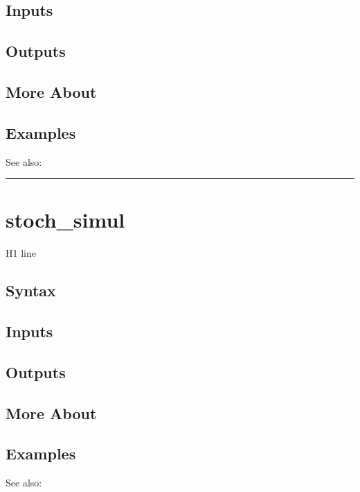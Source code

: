 \documentclass[letterpaper,10pt,english]{sphinxmanual}
\begin{document}
\subsection{Inputs}
\label{classes/models/@rfvar/rfvar:id156}

\subsection{Outputs}
\label{classes/models/@rfvar/rfvar:id157}

\subsection{More About}
\label{classes/models/@rfvar/rfvar:id158}

\subsection{Examples}
\label{classes/models/@rfvar/rfvar:id159}
See also:


\bigskip\hrule{}\bigskip



\section{stoch\_simul}
\label{classes/models/@rfvar/rfvar:id160}\label{classes/models/@rfvar/rfvar:stoch-simul}
H1 line


\subsection{Syntax}
\label{classes/models/@rfvar/rfvar:id161}

\subsection{Inputs}
\label{classes/models/@rfvar/rfvar:id162}

\subsection{Outputs}
\label{classes/models/@rfvar/rfvar:id163}

\subsection{More About}
\label{classes/models/@rfvar/rfvar:id164}

\subsection{Examples}
\label{classes/models/@rfvar/rfvar:id165}
See also:
\end{document}
